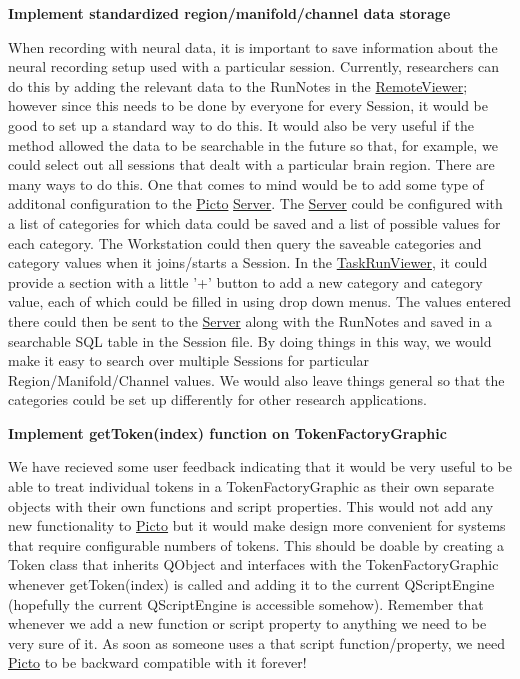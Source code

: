 {\bfseries Implement standardized region/manifold/channel data storage}\par
 When recording with neural data, it is important to save information about the neural recording setup used with a particular session. Currently, researchers can do this by adding the relevant data to the Run\-Notes in the \hyperlink{class_remote_viewer}{Remote\-Viewer}; however since this needs to be done by everyone for every Session, it would be good to set up a standard way to do this. It would also be very useful if the method allowed the data to be searchable in the future so that, for example, we could select out all sessions that dealt with a particular brain region. There are many ways to do this. One that comes to mind would be to add some type of additonal configuration to the \hyperlink{namespace_picto}{Picto} \hyperlink{class_server}{Server}. The \hyperlink{class_server}{Server} could be configured with a list of categories for which data could be saved and a list of possible values for each category. The Workstation could then query the saveable categories and category values when it joins/starts a Session. In the \hyperlink{class_task_run_viewer}{Task\-Run\-Viewer}, it could provide a section with a little '+' button to add a new category and category value, each of which could be filled in using drop down menus. The values entered there could then be sent to the \hyperlink{class_server}{Server} along with the Run\-Notes and saved in a searchable S\-Q\-L table in the Session file. By doing things in this way, we would make it easy to search over multiple Sessions for particular Region/\-Manifold/\-Channel values. We would also leave things general so that the categories could be set up differently for other research applications.

{\bfseries Implement get\-Token(index) function on Token\-Factory\-Graphic}\par
 We have recieved some user feedback indicating that it would be very useful to be able to treat individual tokens in a Token\-Factory\-Graphic as their own separate objects with their own functions and script properties. This would not add any new functionality to \hyperlink{namespace_picto}{Picto} but it would make design more convenient for systems that require configurable numbers of tokens. This should be doable by creating a Token class that inherits Q\-Object and interfaces with the Token\-Factory\-Graphic whenever get\-Token(index) is called and adding it to the current Q\-Script\-Engine (hopefully the current Q\-Script\-Engine is accessible somehow). Remember that whenever we add a new function or script property to anything we need to be very sure of it. As soon as someone uses a that script function/property, we need \hyperlink{namespace_picto}{Picto} to be backward compatible with it forever!


